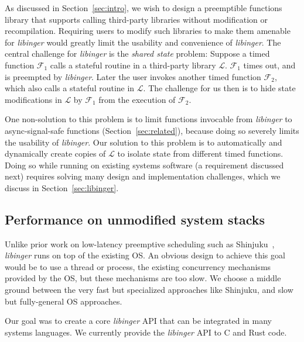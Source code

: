 As discussed in Section~\ref{sec:intro}, we wish to design a preemptible
functions library that supports calling third-party libraries without
modification or recompilation. Requiring users to modify such libraries to make
them amenable for \textit{libinger} would greatly limit the usability and convenience
of \textit{libinger}. The central challenge for \textit{libinger} is the \emph{shared
state} problem: Suppose a timed function $\mathcal{F_1}$ calls a stateful
routine in a third-party library $\mathcal{L}$. $\mathcal{F_1}$ times out, and
is preempted by \textit{libinger}. Later the user invokes another timed function
$\mathcal{F_2}$, which also calls a stateful routine in $\mathcal{L}$. The
challenge for us then is to hide state modifications in $\mathcal{L}$ by
$\mathcal{F_1}$ from the execution of $\mathcal{F_2}$.

One non-solution to this problem is to limit functions invocable from
\textit{libinger} to async-signal-safe functions (Section~\ref{sec:related}), because
doing so severely limits the usability of \textit{libinger}. Our solution to this
problem is to automatically and dynamically create copies of $\mathcal{L}$ to
isolate state from different timed functions. Doing so while running on
existing systems software (a requirement discussed next) requires solving many
design and implementation challenges, which we discuss in
Section~\ref{sec:libinger}.


\subsection{Performance on unmodified system stacks}

Unlike prior work on low-latency preemptive scheduling such as
Shinjuku~\cite{Kaffes:nsdi2019}, \textit{libinger} runs on top of the existing
OS. An obvious design to achieve this goal would be to use a thread or process,
the existing concurrency mechanisms provided by the OS, but these mechanisms
are too slow. We choose a middle ground between the very fast but specialized
approaches like Shinjuku, and slow but fully-general OS approaches.

Our goal was to create a core \textit{libinger} API that can be integrated in many
systems languages. We currently provide the \textit{libinger} API to C and Rust code.



